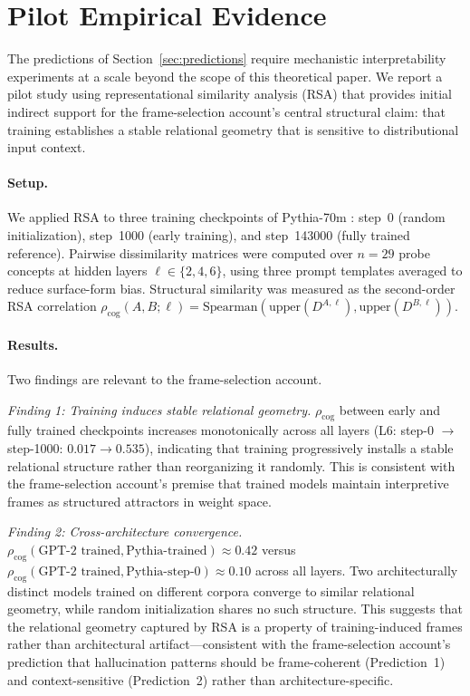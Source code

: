 \documentclass[12pt]{article}
\begin{document}
\section{Pilot Empirical Evidence}
\label{sec:pilot}

The predictions of Section~\ref{sec:predictions} require
mechanistic interpretability experiments at a scale beyond
the scope of this theoretical paper.
We report a pilot study using representational similarity
analysis (RSA) that provides initial indirect support for
the frame-selection account's central structural claim:
that training establishes a stable relational geometry that
is sensitive to distributional input context.

\paragraph{Setup.}
We applied RSA to three training checkpoints of Pythia-70m
\cite{biderman2023}: step~0 (random initialization),
step~1000 (early training), and step~143000 (fully trained
reference).
Pairwise dissimilarity matrices were computed over $n = 29$
probe concepts at hidden layers $\ell \in \{2, 4, 6\}$,
using three prompt templates averaged to reduce surface-form
bias.
Structural similarity was measured as the second-order RSA
correlation $\rho_\mathrm{cog}(A, B; \ell) =
\mathrm{Spearman}(\mathrm{upper}(D^{A,\ell}),
\mathrm{upper}(D^{B,\ell}))$.

\paragraph{Results.}
Two findings are relevant to the frame-selection account.

\emph{Finding 1: Training induces stable relational geometry.}
$\rho_\mathrm{cog}$ between early and fully trained checkpoints
increases monotonically across all layers
(L6: step-0 $\to$ step-1000: $0.017 \to 0.535$),
indicating that training progressively installs a stable
relational structure rather than reorganizing it randomly.
This is consistent with the frame-selection account's
premise that trained models maintain interpretive frames
as structured attractors in weight space.

\emph{Finding 2: Cross-architecture convergence.}
$\rho_\mathrm{cog}(\text{GPT-2 trained},
\text{Pythia-trained}) \approx 0.42$ versus
$\rho_\mathrm{cog}(\text{GPT-2 trained},
\text{Pythia-step-0}) \approx 0.10$ across all layers.
Two architecturally distinct models trained on different
corpora converge to similar relational geometry,
while random initialization shares no such structure.
This suggests that the relational geometry captured by RSA
is a property of training-induced frames rather than
architectural artifact---consistent with the frame-selection
account's prediction that hallucination patterns should
be frame-coherent (Prediction~1) and context-sensitive
(Prediction~2) rather than architecture-specific.
\end{document}
